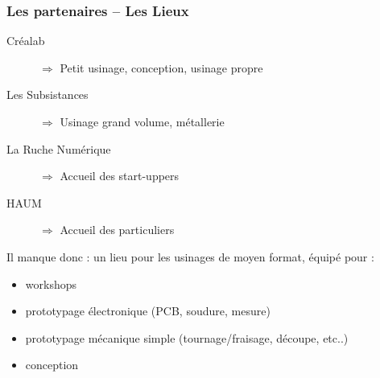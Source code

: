 \documentclass[10pt, compress]{beamer}
\begin{document}
	\begin{frame}
		\frametitle{Les partenaires -- Les Lieux}

		\begin{description}
			\item[Créalab] $\Rightarrow$ Petit usinage, conception, usinage propre
			\item[Les Subsistances] $\Rightarrow$ Usinage grand volume, métallerie
			\item[La Ruche Numérique] $\Rightarrow$ Accueil des start-uppers
			\item[HAUM] $\Rightarrow$ Accueil des particuliers
		\end{description}

		\pause

		Il manque donc : un lieu pour les usinages de moyen format, équipé pour :

		\pause

		\begin{itemize}[<+->]
			\item \alert{workshops}
			\item \alert{prototypage} électronique (PCB, soudure, mesure)
			\item \alert{prototypage} mécanique simple (tournage/fraisage, découpe, etc..)
			\item \alert{conception}
		\end{itemize}
	\end{frame}
\end{document}
